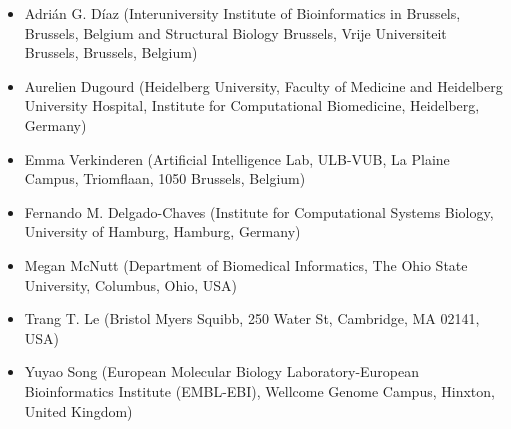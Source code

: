 \begin{itemize}
\tightlist
\item
  Adrián G. Díaz (Interuniversity Institute of Bioinformatics in Brussels, Brussels, Belgium and Structural Biology Brussels, Vrije Universiteit Brussels, Brussels, Belgium)
\item
  Aurelien Dugourd (Heidelberg University, Faculty of Medicine and Heidelberg University Hospital, Institute for Computational Biomedicine, Heidelberg, Germany)
\item
  Emma Verkinderen (Artificial Intelligence Lab, ULB-VUB, La Plaine Campus, Triomflaan, 1050 Brussels, Belgium)
\item
  Fernando M. Delgado-Chaves (Institute for Computational Systems Biology, University of Hamburg, Hamburg, Germany)
\item
  Megan McNutt (Department of Biomedical Informatics, The Ohio State University, Columbus, Ohio, USA)
\item
  Trang T. Le (Bristol Myers Squibb, 250 Water St, Cambridge, MA 02141, USA)
\item
  Yuyao Song (European Molecular Biology Laboratory-European Bioinformatics Institute (EMBL-EBI), Wellcome Genome Campus, Hinxton, United Kingdom)
\end{itemize}
